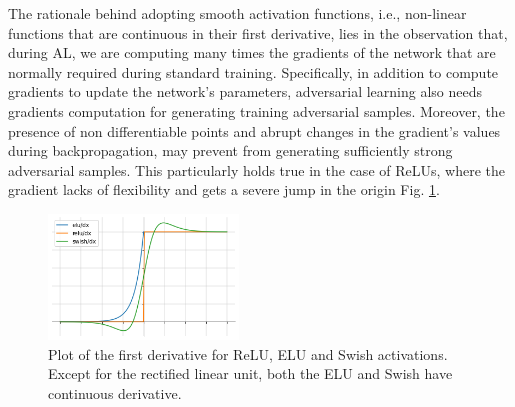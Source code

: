 \documentclass[LaM,binding=0.6cm]{./packages/sapthesis/sapthesis}
\begin{document}
    The rationale behind adopting smooth activation functions, i.e., non-linear functions that are continuous in their first derivative, lies in the 
    observation that, during AL, we are computing many times the gradients of the network that are normally required during standard training. Specifically,
    in addition to compute gradients to update the network's parameters, adversarial learning also needs gradients computation for generating training 
    adversarial samples. Moreover, the presence of non differentiable points and abrupt changes in the gradient's values during backpropagation, may 
    prevent from generating sufficiently strong adversarial samples. This particularly holds true in the case of ReLUs, where the gradient lacks of flexibility 
    and gets a severe jump in the origin Fig. \ref{fig:smoothaf}. 

    \begin{figure}[h]
        \centering
        \includegraphics[width=0.45\textwidth]{smothaf.png}
        \caption{Plot of the first derivative for ReLU, ELU and Swish activations. Except for the rectified linear unit, both the ELU and Swish have continuous
        derivative.}
        \label{fig:smoothaf}
    \end{figure}
\end{document}
